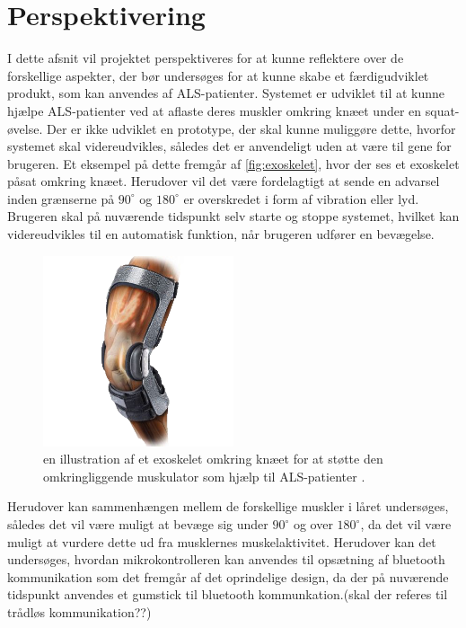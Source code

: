 \section{Perspektivering} \label{perspektivering}
I dette afsnit vil projektet perspektiveres for at kunne reflektere over de forskellige aspekter, der bør undersøges for at kunne skabe et færdigudviklet produkt, som kan anvendes af ALS-patienter. Systemet er udviklet til at kunne hjælpe ALS-patienter ved at aflaste deres muskler omkring knæet under en squat-øvelse. Der er ikke udviklet en prototype, der skal kunne muliggøre dette, hvorfor systemet skal videreudvikles, således det er anvendeligt uden at være til gene for brugeren. Et eksempel på dette fremgår af \autoref{fig:exoskelet}, hvor der ses et exoskelet påsat omkring knæet. Herudover vil det være fordelagtigt at sende en advarsel inden grænserne på $90^{\circ}$ og $180^{\circ}$ er overskredet i form af vibration eller lyd. Brugeren skal på nuværende tidspunkt selv starte og stoppe systemet, hvilket kan videreudvikles til en automatisk funktion, når brugeren udfører en bevægelse. 

\begin{figure}[H]
\centering
\includegraphics[width=0.5\textwidth]{figures/exoskelet}
\caption{en illustration af et exoskelet omkring knæet for at støtte den omkringliggende muskulator som hjælp til ALS-patienter \citep{djo}.}
\label{fig:exoskelet}
\end{figure}

\noindent
Herudover kan sammenhængen mellem de forskellige muskler i låret undersøges, således det vil være muligt at bevæge sig under $90^{\circ}$ og over $180^{\circ}$, da det vil være muligt at vurdere dette ud fra musklernes muskelaktivitet. Herudover kan det undersøges, hvordan mikrokontrolleren kan anvendes til opsætning af bluetooth kommunikation som det fremgår af det oprindelige design, da der på nuværende tidspunkt anvendes et gumstick til bluetooth kommunkation.(skal der referes til trådløs kommunikation??)

